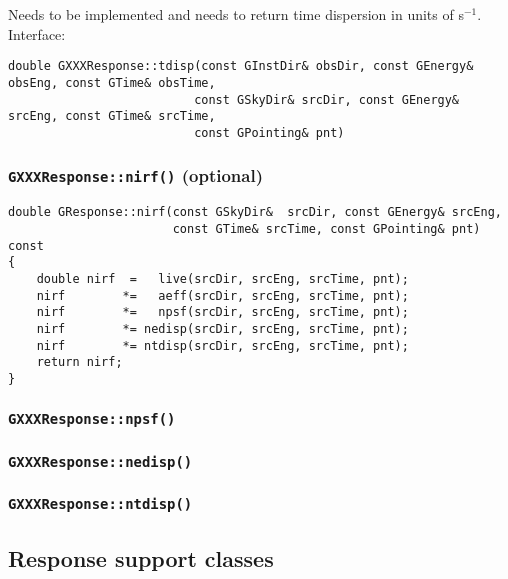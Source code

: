 \documentclass{article}[12pt,a4]
\begin{document}
Needs to be implemented and needs to return time dispersion in units of s$^{-1}$.
Interface:
\begin{verbatim}
double GXXXResponse::tdisp(const GInstDir& obsDir, const GEnergy& obsEng, const GTime& obsTime,
                          const GSkyDir& srcDir, const GEnergy& srcEng, const GTime& srcTime,
                          const GPointing& pnt)
\end{verbatim}


\subsubsection{{\tt GXXXResponse::nirf()} (optional)}

\begin{verbatim}
double GResponse::nirf(const GSkyDir&  srcDir, const GEnergy& srcEng,
                       const GTime& srcTime, const GPointing& pnt) const
{
    double nirf  =   live(srcDir, srcEng, srcTime, pnt);
    nirf        *=   aeff(srcDir, srcEng, srcTime, pnt);
    nirf        *=   npsf(srcDir, srcEng, srcTime, pnt);
    nirf        *= nedisp(srcDir, srcEng, srcTime, pnt);
    nirf        *= ntdisp(srcDir, srcEng, srcTime, pnt);
    return nirf;
}
\end{verbatim}



\subsubsection{{\tt GXXXResponse::npsf()}}


\subsubsection{{\tt GXXXResponse::nedisp()}}


\subsubsection{{\tt GXXXResponse::ntdisp()}}


\subsection{Response support classes}
\end{document}
